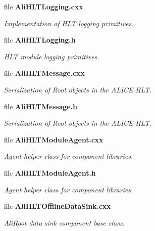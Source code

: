 \begin{CompactItemize}
\item 
file {\bf Ali\-HLTLogging.cxx}
\begin{CompactList}\small\item\em Implementation of HLT logging primitives. \item\end{CompactList}

\item 
file {\bf Ali\-HLTLogging.h}
\begin{CompactList}\small\item\em HLT module logging primitives. \item\end{CompactList}

\item 
file {\bf Ali\-HLTMessage.cxx}
\begin{CompactList}\small\item\em Serialization of Root objects in the ALICE HLT. \item\end{CompactList}

\item 
file {\bf Ali\-HLTMessage.h}
\begin{CompactList}\small\item\em Serialization of Root objects in the ALICE HLT. \item\end{CompactList}

\item 
file {\bf Ali\-HLTModule\-Agent.cxx}
\begin{CompactList}\small\item\em Agent helper class for component libraries. \item\end{CompactList}

\item 
file {\bf Ali\-HLTModule\-Agent.h}
\begin{CompactList}\small\item\em Agent helper class for component libraries. \item\end{CompactList}

\item 
file {\bf Ali\-HLTOffline\-Data\-Sink.cxx}
\begin{CompactList}\small\item\em Ali\-Root data sink component base class. \item\end{CompactList}


\end{CompactItemize}
